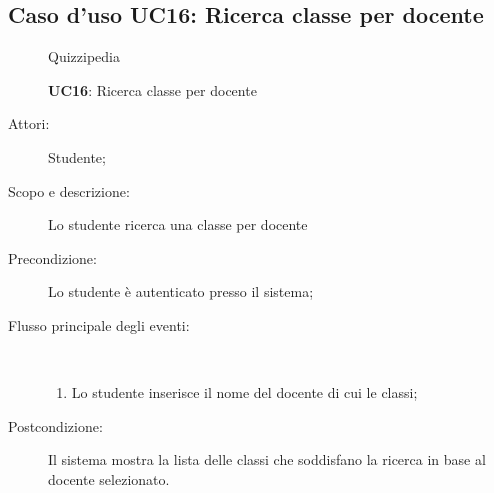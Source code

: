 \subsection{Caso d'uso UC16: Ricerca classe per docente}
	\begin{figure}[H]
		\centering
		\begin{resizedtikzpicture}{\textwidth}
		\begin{umlsystem}[x=0, fill=lightgray!20]{Quizzipedia}
		\end{umlsystem}
		\end{resizedtikzpicture}
		\caption{\textbf{UC16}: Ricerca classe per docente}
		\label{UC16}
	\end{figure}
\begin{description}
\item[Attori:] Studente;
\item[Scopo e descrizione:] Lo studente ricerca una classe per docente
      \item[Precondizione:] Lo studente è autenticato presso il sistema;

        \item[Flusso principale degli eventi:] \ 
 \begin{enumerate}
          \item Lo studente inserisce il nome del docente di cui le classi;

      \end{enumerate}
    \item[Postcondizione:] Il sistema mostra la lista delle classi che soddisfano la ricerca in base al docente selezionato.
  \end{description}
\hypertarget{UC17}{}
